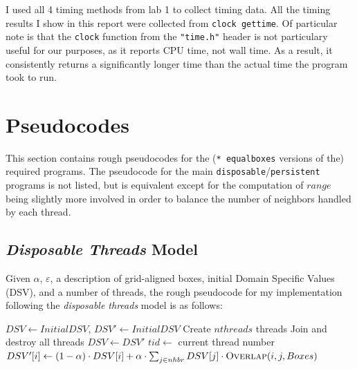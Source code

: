 \documentclass{article}
\begin{document}
I used all 4 timing methods from lab 1 to collect timing data. All the timing
results I show in this report were collected from \texttt{clock\textunderscore
gettime}. Of particular note is that the \texttt{clock} function from the
\texttt{"time.h"} header is not particulary useful for our purposes, as it
reports CPU time, not wall time. As a result, it consistently returns a
significantly longer time than the actual time the program took to run.

\newpage
\section*{Pseudocodes}
\label{sec:pseudocoes}

This section contains rough pseudocodes for the (\texttt{*\textunderscore
equal\textunderscore boxes} versions of the) required programs. The pseudocode
for the main \texttt{disposable}/\texttt{persistent} programs is not listed,
but is equivalent except for the computation of $range$ being slightly more
involved in order to balance the number of neighbors handled by each thread.

\vspace{-1em}
\subsection*{\emph{Disposable Threads} Model}

Given $\alpha$, $\varepsilon$, a description of grid-aligned boxes, initial
Domain Specific Values (DSV), and a number of threads, the rough pseudocode for
my implementation following the \emph{disposable threads} model is as follows:

\begin{algorithm}
\small
\begin{algorithmic}[1]
\State $DSV \gets Initial DSV$, $DSV' \gets Initial DSV$
 \label{alg:amr:convergence}
    \State Create $nthreads$ threads
        \State {}
    \EndFor
    \State Join and destroy all threads
    \State $DSV \gets DSV'$ \label{alg:amr:commit}
\EndWhile
\EndProcedure
{}
    \State $tid \gets$ current thread number
        \State $DSV'[i] \gets (1 - \alpha)\cdot DSV[i] + \alpha \cdot \sum_{j\in nhbr} DSV[j]\cdot \Call{Overlap}{i, j, Boxes}$
    \EndFor
\EndProcedure
\end{algorithmic}
\end{algorithm}
\end{document}
